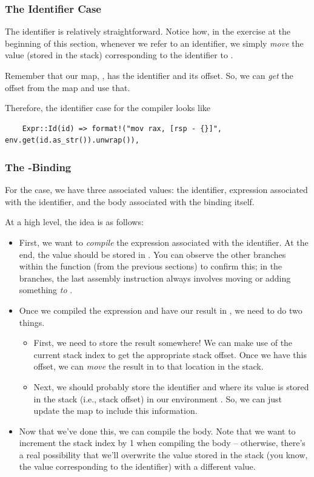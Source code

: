 \subsubsection{The Identifier Case}
The identifier is relatively straightforward. Notice how, in the exercise at the beginning of this section, whenever we refer to an identifier, we simply \emph{move} the value (stored in the stack) corresponding to the identifier to . 

\bigskip 

Remember that our map, , has the identifier and its offset. So, we can \emph{get} the offset from the map and use that. 

\bigskip 

Therefore, the identifier case for the compiler looks like 
\begin{verbatim}
    Expr::Id(id) => format!("mov rax, [rsp - {}]", env.get(id.as_str()).unwrap()),\end{verbatim} 

\subsubsection{The -Binding}
For the  case, we have three associated values: the identifier, expression associated with the identifier, and the body associated with the binding itself. 

\bigskip 

At a high level, the idea is as follows:
\begin{itemize}
    \item First, we want to \emph{compile} the expression associated with the identifier. At the end, the value should be stored in . You can observe the other branches within the  function (from the previous sections) to confirm this; in the branches, the last assembly instruction always involves moving or adding something \emph{to} . 
    \item Once we compiled the expression and have our result in , we need to do two things. 
    \begin{itemize}
        \item First, we need to store the result somewhere! We can make use of the current stack index to get the appropriate stack offset. Once we have this offset, we can \emph{move} the result in  to that location in the stack.
        \item Next, we should probably store the identifier and where its value is stored in the stack (i.e., stack offset) in our environment . So, we can just update the map to include this information. 
    \end{itemize}
    \item Now that we've done this, we can compile the body. Note that we want to increment the stack index by 1 when compiling the body -- otherwise, there's a real possibility that we'll overwrite the value stored in the stack (you know, the value corresponding to the identifier) with a different value.
\end{itemize}

